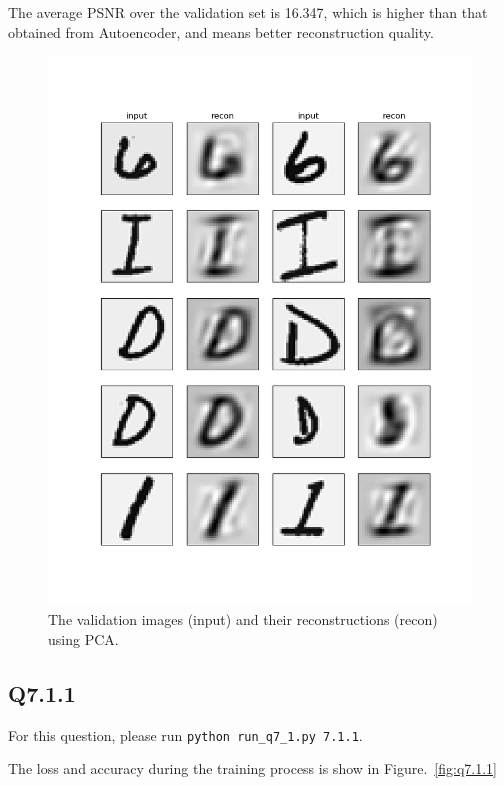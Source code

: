 \documentclass[11pt]{article}
\newcommand{\code}[1]{\texttt{#1}}
\begin{document}
The average PSNR over the validation set is 16.347, which is higher than that obtained from Autoencoder, and means better reconstruction quality.

\begin{figure}[h!]
    \centering
    \includegraphics[width=.8\linewidth]{../results/q6_2.png}
    \caption{The validation images (input) and their reconstructions (recon) using PCA. }
    \label{fig:q6.2}
\end{figure}

\newpage
\subsection*{Q7.1.1}

For this question, please run \code{python run\_q7\_1.py 7.1.1}.

The loss and accuracy during the training process is show in Figure.~\ref{fig:q7.1.1}
\end{document}
